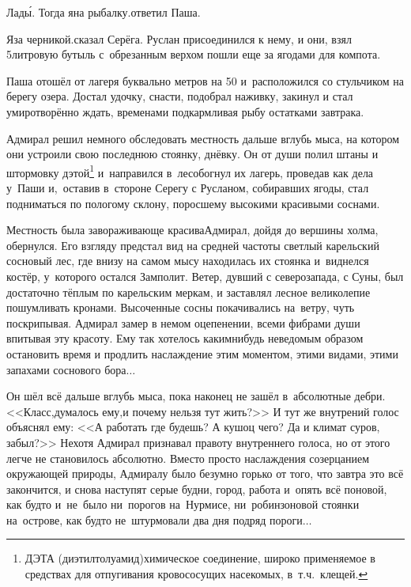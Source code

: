 \diagdash Лад\'{ы}. Тогда я\mdash на рыбалку.\mdash ответил Паша.

\diagdash Я\mdash за черникой.\mdash сказал Серёга. Руслан присоединился к нему, и они, взял 5\sdash литровую бутыль с~обрезанным верхом пошли еще за ягодами для компота.

Паша отошёл от лагеря буквально метров на 50 и~расположился со стульчиком на берегу озера. Достал удочку, снасти, подобрал наживку, закинул и стал умиротворённо ждать, временами подкармливая рыбу остатками завтрака. %

Адмирал решил немного обследовать местность дальше вглубь мыса, на котором они устроили свою последнюю стоянку, днёвку. Он от души полил штаны и штормовку дэтой\footnote{ДЭТА (диэтилтолуамид)\mdash химическое соединение, широко применяемое в средствах для отпугивания кровососущих насекомых, в~т.ч.~клещей.} и~направился в~лес\mdash обогнул их лагерь, проведав как дела у~Паши и,~оставив в~стороне Серегу с Русланом, собиравших ягоды, стал подниматься по пологому склону, поросшему высокими красивыми соснами. 

Местность была завораживающе красива\mdash Адмирал, дойдя до вершины холма, обернулся. Его взгляду предстал вид на средней частоты светлый карельский сосновый лес, где внизу на самом мысу находилась их стоянка и~виднелся костёр, у~которого остался Замполит. Ветер, дувший с северо\sdash запада, с Суны, был достаточно тёплым по карельским меркам, и заставлял лесное великолепие пошумливать кронами. Высоченные сосны покачивались на~ветру, чуть поскрипывая. Адмирал замер в немом оцепенении, всеми фибрами души впитывая эту красоту. Ему так хотелось каким\sdash нибудь неведомым образом остановить время и продлить наслаждение этим моментом, этими видами, этими запахами соснового бора$\ldots$ 

Он шёл всё дальше вглубь мыса, пока наконец не зашёл в~абсолютные дебри. <<Класс,\mdash думалось ему,\mdash и почему нельзя тут жить?>> И тут же внутрений голос объяснял ему: <<А работать где будешь? А кушоц чего? Да и климат суров, забыл?>> Нехотя Адмирал признавал правоту внутреннего голоса, но от этого легче не становилось абсолютно. Вместо просто наслаждения созерцанием окружающей природы, Адмиралу было безумно горько от того, что завтра это всё закончится, и снова наступят серые будни, город, работа и~опять всё по\sdash новой, как будто и~не~было ни~порогов на~Нурмисе, ни~робинзоновой стоянки на~острове, как будто не~штурмовали два дня подряд пороги$\ldots$ 

